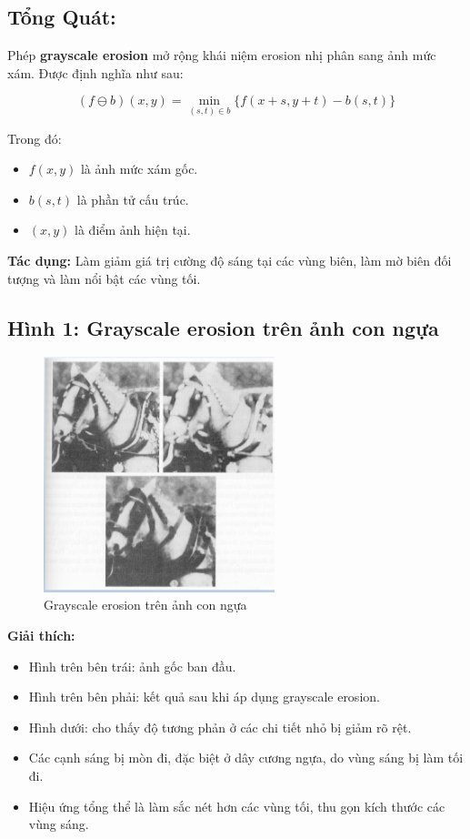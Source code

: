 \documentclass[12pt]{article}
\begin{document}
	 \subsection{Tổng Quát:}
	 
	 Phép \textbf{grayscale erosion} mở rộng khái niệm erosion nhị phân sang ảnh mức xám. Được định nghĩa như sau:
	 
	 \[
	 (f \ominus b)(x, y) = \min_{(s,t) \in b} \{ f(x + s, y + t) - b(s, t) \}
	 \]
	 
	 Trong đó:
	 \begin{itemize}
	 	\item $f(x, y)$ là ảnh mức xám gốc.
	 	\item $b(s, t)$ là phần tử cấu trúc.
	 	\item $(x, y)$ là điểm ảnh hiện tại.
	 \end{itemize}
	 
	 \textbf{Tác dụng:} Làm giảm giá trị cường độ sáng tại các vùng biên, làm mờ biên đối tượng và làm nổi bật các vùng tối.
	 
	\subsection{Hình 1: Grayscale erosion trên ảnh con ngựa}
	
	\begin{figure}[h!]
		\centering
		\includegraphics[width=0.6\textwidth]{images/31_1.png}
		\caption{Grayscale erosion trên ảnh con ngựa}
		\label{fig:erosion_horse}
	\end{figure}
	
	\textbf{Giải thích:}
	\begin{itemize}
		\item Hình trên bên trái: ảnh gốc ban đầu.
		\item Hình trên bên phải: kết quả sau khi áp dụng grayscale erosion.
		\item Hình dưới: cho thấy độ tương phản ở các chi tiết nhỏ bị giảm rõ rệt.
		\item Các cạnh sáng bị mòn đi, đặc biệt ở dây cương ngựa, do vùng sáng bị làm tối đi.
		\item Hiệu ứng tổng thể là làm sắc nét hơn các vùng tối, thu gọn kích thước các vùng sáng.
	\end{itemize}
	
\end{document}
